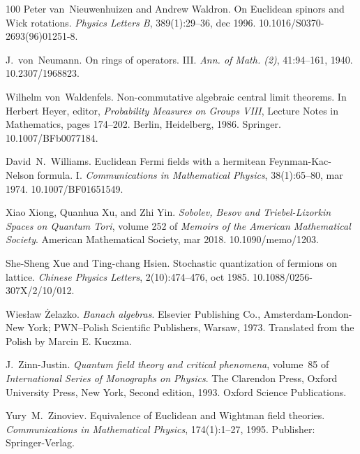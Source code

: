\documentclass{article}
\newcommand{\tmtextit}[1]{{\itshape{#1}}}
\begin{document}
\begin{thebibliography}{100}
  Peter van~Nieuwenhuizen  and 
  Andrew Waldron. {\newblock}On Euclidean spinors and Wick rotations.
  {\newblock}\tmtextit{Physics Letters B}, 389(1):29--36, dec 1996.
  {\newblock}\href{Https://doi.org/10.1016/S0370-2693(96)01251-8}{}10.1016/S0370-2693(96)01251-8.{\newblock}
  
  J.~von~Neumann. {\newblock}On rings of operators.
  III. {\newblock}\tmtextit{Ann. of Math. (2)}, 41:94--161, 1940.
  {\newblock}\href{Https://doi.org/10.2307/1968823}{}10.2307/1968823.{\newblock}
  
  Wilhelm von~Waldenfels.
  {\newblock}Non-commutative algebraic central limit theorems. {\newblock}In 
  Herbert Heyer, editor, \tmtextit{Probability Measures on Groups VIII},
  Lecture Notes in Mathematics,  pages  174--202. Berlin, Heidelberg, 1986.
  Springer.
  {\newblock}\href{Https://doi.org/10.1007/BFb0077184}{}10.1007/BFb0077184.{\newblock}
  
  David~N.~Williams.
  {\newblock}Euclidean Fermi fields with a hermitean Feynman-Kac-Nelson
  formula. I. {\newblock}\tmtextit{Communications in Mathematical Physics},
  38(1):65--80, mar 1974.
  {\newblock}\href{Https://doi.org/10.1007/BF01651549}{}10.1007/BF01651549.{\newblock}
  
  Xiao Xiong, Quanhua Xu, and  Zhi Yin.
  {\newblock}\tmtextit{Sobolev, Besov and Triebel-Lizorkin Spaces on Quantum
  Tori},  volume  252  of \tmtextit{Memoirs of the American Mathematical
  Society}. {\newblock}American Mathematical Society, mar 2018.
  {\newblock}\href{Https://doi.org/10.1090/memo/1203}{}10.1090/memo/1203.{\newblock}
  
  She-Sheng Xue  and  Ting-chang
  Hsien. {\newblock}Stochastic quantization of fermions on lattice.
  {\newblock}\tmtextit{Chinese Physics Letters}, 2(10):474--476, oct 1985.
  {\newblock}\href{Https://doi.org/10.1088/0256-307X/2/10/012}{}10.1088/0256-307X/2/10/012.{\newblock}
  
  Wies{\l}aw {\.Z}elazko. {\newblock}\tmtextit{Banach
  algebras}. {\newblock}Elsevier Publishing Co., Amsterdam-London-New York;
  PWN--Polish Scientific Publishers, Warsaw, 1973. {\newblock}Translated from
  the Polish by Marcin E. Kuczma.{\newblock}
  
  J.~Zinn-Justin. {\newblock}\tmtextit{Quantum field
  theory and critical phenomena},  volume~85  of \tmtextit{International
  Series of Monographs on Physics}. {\newblock}The Clarendon Press, Oxford
  University Press, New York, Second  edition, 1993. {\newblock}Oxford Science
  Publications.{\newblock}
  
  Yury~M.~Zinoviev.
  {\newblock}Equivalence of Euclidean and Wightman field theories.
  {\newblock}\tmtextit{Communications in Mathematical Physics}, 174(1):1--27,
  1995. {\newblock}Publisher: Springer-Verlag.{\newblock}
\end{thebibliography}
\end{document}
